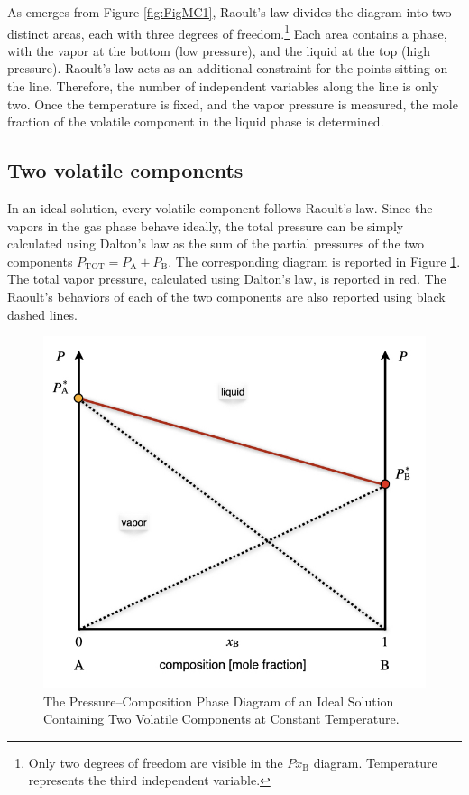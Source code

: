 \documentclass[
  9pt,
]{extbook}
\theoremstyle{definition}
\theoremstyle{definition}
\theoremstyle{definition}
\theoremstyle{definition}
\theoremstyle{remark}
\begin{document}
As emerges from Figure \ref{fig:FigMC1}, Raoult's law divides the diagram into two distinct areas, each with three degrees of freedom.\footnote{Only two degrees of freedom are visible in the \(Px_{\text{B}}\) diagram. Temperature represents the third independent variable.} Each area contains a phase, with the vapor at the bottom (low pressure), and the liquid at the top (high pressure). Raoult's law acts as an additional constraint for the points sitting on the line. Therefore, the number of independent variables along the line is only two. Once the temperature is fixed, and the vapor pressure is measured, the mole fraction of the volatile component in the liquid phase is determined.

\subsection{Two volatile components}\label{two-volatile-components}

In an ideal solution, every volatile component follows Raoult's law. Since the vapors in the gas phase behave ideally, the total pressure can be simply calculated using Dalton's law as the sum of the partial pressures of the two components \(P_{\text{TOT}}=P_{\text{A}}+P_{\text{B}}\). The corresponding diagram is reported in Figure \ref{fig:FigMC2}. The total vapor pressure, calculated using Dalton's law, is reported in red. The Raoult's behaviors of each of the two components are also reported using black dashed lines.

\begin{figure}

{\centering \includegraphics[width=0.6\linewidth]{./img/OEP_Figures.020} 

}

\caption{The Pressure–Composition Phase Diagram of an Ideal Solution Containing Two Volatile Components at Constant Temperature.}\label{fig:FigMC2}
\end{figure}
\end{document}
